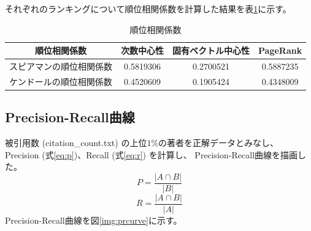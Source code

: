 \documentclass{jsarticle}
\begin{document}
それぞれのランキングについて順位相関係数を計算した結果を表\ref{tbl:cor}に示す。
\begin{table}[h]
    \centering
    \caption{順位相関係数}
    \label{tbl:cor}
    \begin{tabular}{c|c|c|c} \hline
        順位相関係数 & 次数中心性 & 固有ベクトル中心性 & PageRank \\ \hline \hline
        スピアマンの順位相関係数 & 0.5819306 & 0.2700521 & 0.5887235 \\
        ケンドールの順位相関係数 & 0.4520609 & 0.1905424 & 0.4348009 \\ \hline
    \end{tabular}
\end{table}

\subsection{Precision-Recall曲線}
被引用数 (citation\_count.txt) の上位$1\%$の著者を正解データとみなし、
Precision (式\ref{eq:p})、Recall (式\ref{eq:r}) を計算し、
Precision-Recall曲線を描画した。
\begin{equation}
    P = \frac{|A \cap B|}{|B|}
    \label{eq:p}
\end{equation}
\begin{equation}
    R = \frac{|A \cap B|}{|A|}
    \label{eq:r}
\end{equation}
Precision-Recall曲線を図\ref{img:prcurve}に示す。
\end{document}
